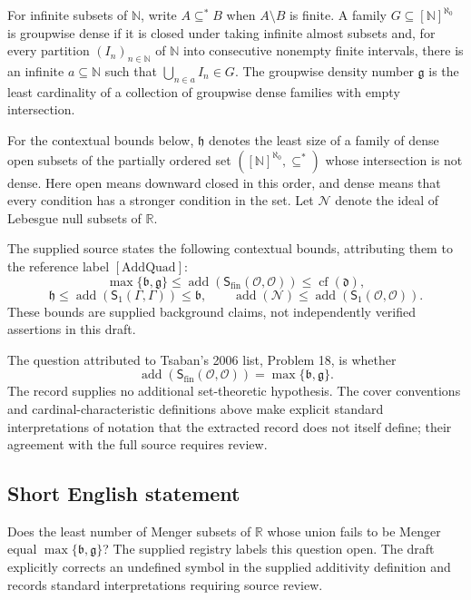 \documentclass[11pt]{article}
\newcommand{\N}{\mathbb{N}}
\newcommand{\R}{\mathbb{R}}
\begin{document}
For infinite subsets of \(\N\), write \(A\subseteq^*B\) when \(A\setminus B\) is finite. A family \(G\subseteq[\N]^{\aleph_0}\) is groupwise dense if it is closed under taking infinite almost subsets and, for every partition \((I_n)_{n\in\N}\) of \(\N\) into consecutive nonempty finite intervals, there is an infinite \(a\subseteq\N\) such that \(\bigcup_{n\in a}I_n\in G\). The groupwise density number \(\mathfrak g\) is the least cardinality of a collection of groupwise dense families with empty intersection.

For the contextual bounds below, \(\mathfrak h\) denotes the least size of a family of dense open subsets of the partially ordered set \(([\N]^{\aleph_0},\subseteq^*)\) whose intersection is not dense. Here open means downward closed in this order, and dense means that every condition has a stronger condition in the set. Let \(\mathcal N\) denote the ideal of Lebesgue null subsets of \(\R\).

The supplied source states the following contextual bounds, attributing them to the reference label \([\mathrm{AddQuad}]\):
\[
\max\{\mathfrak b,\mathfrak g\}\leq
\operatorname{add}(\mathsf S_{\mathrm{fin}}(\mathcal O,\mathcal O))
\leq\operatorname{cf}(\mathfrak d),
\]
\[
\mathfrak h\leq\operatorname{add}(\mathsf S_1(\Gamma,\Gamma))\leq\mathfrak b,
\qquad
\operatorname{add}(\mathcal N)\leq\operatorname{add}(\mathsf S_1(\mathcal O,\mathcal O)).
\]
These bounds are supplied background claims, not independently verified assertions in this draft.

The question attributed to Tsaban's 2006 list, Problem 18, is whether
\[
\operatorname{add}(\mathsf S_{\mathrm{fin}}(\mathcal O,\mathcal O))
=\max\{\mathfrak b,\mathfrak g\}.
\]
The record supplies no additional set-theoretic hypothesis. The cover conventions and cardinal-characteristic definitions above make explicit standard interpretations of notation that the extracted record does not itself define; their agreement with the full source requires review.
\subsection{Short English statement}
Does the least number of Menger subsets of \(\R\) whose union fails to be Menger equal \(\max\{\mathfrak b,\mathfrak g\}\)? The supplied registry labels this question open. The draft explicitly corrects an undefined symbol in the supplied additivity definition and records standard interpretations requiring source review.
\end{document}
